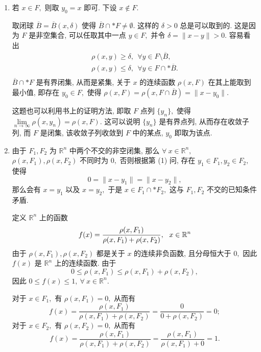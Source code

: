 \begin{solution}
\begin{enumerate}
\item 若 $x \in F,$ 则取 $y_0 = x$ 即可. 下设 $x \not\in F$.

取闭球 $\overline{B} = \overline{B}(x, \delta)$ 使得 $\overline{B} \cap* F \neq \emptyset.$ 这样的 $\delta > 0$ 总是可以取到的. 这是因为 $F$ 是非空集合, 可以任取其中一点 $y \in F,$ 并令 $\delta = \lVert x - y \rVert > 0.$ 容易看出
\begin{equation*}
\begin{gathered}
\rho(x, y) \geqslant \delta, ~~ \forall y \in F \setminus \overline{B}, \\
\rho(x, y) \leqslant \delta, ~~ \forall y \in F \cap* \overline{B}. \\
\end{gathered}
\end{equation*}
$\overline{B} \cap* F$ 是有界闭集, 从而是紧集, 关于 $x$ 的连续函数 $\rho(x, F)$ 在其上能取到最小值, 即存在 $y_0 \in F,$ 使得 $\rho(x, F) = \rho(x, F \cap \overline{B}) = \lVert x - y_0 \rVert.$ 

这题也可以利用书上的证明方法, 即取 $F$ 点列 $\{y_n\},$ 使得 $\lim\limits_{n\to\infty} \rho(x, y_n) = \rho(x, F).$ 这可以说明 $\{y_n\}$ 是有界点列, 从而存在收敛子列, 而 $F$ 是闭集, 该收敛子列收敛到 $F$ 中的某点, $y_0$ 即取为该点.

\item 由于 $F_1, F_2$ 为 $\mathbb{R}^n$ 中两个不交的非空闭集, 那么 $\forall ~ x \in \mathbb{R}^n,$ $\rho(x, F_1), \rho(x, F_2)$ 不同时为 $0,$ 否则根据第 (1) 问, 存在 $y_1 \in F_1, y_2 \in F_2,$ 使得
$$0 = \lVert x - y_1 \rVert = \lVert x - y_2 \rVert,$$
那么会有 $x = y_1$ 以及 $x = y_2,$ 于是 $x \in F_1 \cap* F_2,$ 这与 $F_1, F_2$ 不交的已知条件矛盾.

定义 $\mathbb{R}^n$ 上的函数
\begin{equation*}
f(x) = \dfrac{\rho(x, F_1)}{\rho(x, F_1) + \rho(x, F_2)}, ~~ x \in \mathbb{R}^n \score{5}
\end{equation*}
由于 $\rho(x, F_1), \rho(x, F_2)$ 都是关于 $x$ 的连续非负函数, 且分母恒大于 $0,$ 因此$f(x)$ 是 $\mathbb{R}^n$ 上的连续函数. 由于
$$0 \leqslant \rho(x, F_1) \leqslant \rho(x, F_1) + \rho(x, F_2),$$
因此 $0 \leqslant f(x) \leqslant 1, ~ \forall ~ x \in \mathbb{R}^n.$

对于 $x \in F_1,$ 有 $\rho(x, F_1) = 0,$ 从而有
$$f(x) = \dfrac{\rho(x, F_1)}{\rho(x, F_1) + \rho(x, F_2)} = \dfrac{0}{0 + \rho(x, F_2)} = 0;$$
对于 $x \in F_2,$ 有 $\rho(x, F_2) = 0,$ 从而有
$$f(x) = \dfrac{\rho(x, F_1)}{\rho(x, F_1) + \rho(x, F_2)} = \dfrac{\rho(x, F_1)}{\rho(x, F_1) + 0} = 1.$$


\end{enumerate}
\end{solution}
